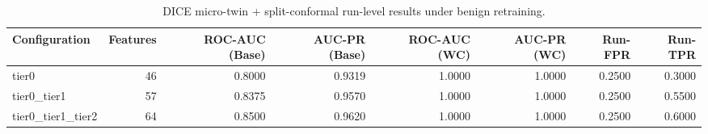 \begin{table}[t]
\centering
\caption{DICE micro-twin + split-conformal run-level results under benign retraining.}
\label{tab:dice_full_overall}
\footnotesize
\begin{tabular}{lrrrrrrr}
\toprule
Configuration & Features & ROC-AUC (Base) & AUC-PR (Base) & ROC-AUC (WC) & AUC-PR (WC) & Run-FPR & Run-TPR \\
\midrule
tier0 & 46 & 0.8000 & 0.9319 & 1.0000 & 1.0000 & 0.2500 & 0.3000 \\
tier0_tier1 & 57 & 0.8375 & 0.9570 & 1.0000 & 1.0000 & 0.2500 & 0.5500 \\
tier0_tier1_tier2 & 64 & 0.8500 & 0.9620 & 1.0000 & 1.0000 & 0.2500 & 0.6000 \\
\bottomrule
\end{tabular}

\end{table}
